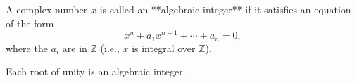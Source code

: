 A complex number $x$ is called an **algebraic integer** if it satisfies an equation of the form
$$x^n + a_1 x^{n-1} + \cdots + a_n = 0,$$
where the $a_i$ are in $\mathbb{Z}$ (i.e., $x$ is integral over $\mathbb{Z}$).

Each root of unity is an algebraic integer.
